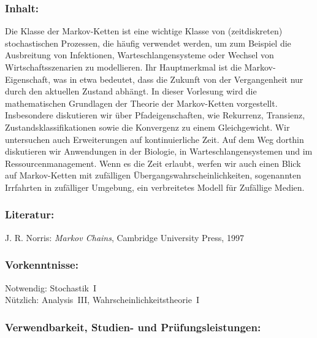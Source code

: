 \documentclass[a4paper,10pt]{article}
\begin{document}
\subsubsection*{\large
    Inhalt:
}
Die Klasse der Markov-Ketten ist eine wichtige Klasse von (zeitdiskreten) stochastischen Prozessen, die häufig verwendet werden, um zum Beispiel die Ausbreitung von Infektionen, Warteschlangensysteme oder Wechsel von Wirtschaftsszenarien zu modellieren. Ihr Hauptmerkmal ist die Markov-Eigenschaft, was in etwa bedeutet, dass die Zukunft von der Vergangenheit nur durch den aktuellen Zustand abhängt. In dieser Vorlesung wird die mathematischen Grundlagen der Theorie der Markov-Ketten vorgestellt. Insbesondere diskutieren wir über Pfadeigenschaften, wie Rekurrenz, Transienz, Zustandsklassifikationen sowie die Konvergenz zu einem Gleichgewicht. Wir untersuchen auch Erweiterungen auf kontinuierliche Zeit. Auf dem Weg dorthin diskutieren wir Anwendungen in der Biologie, in Warteschlangensystemen und  im Ressourcenmanagement. Wenn es die Zeit erlaubt, werfen wir auch einen Blick auf Markov-Ketten mit zufälligen Übergangswahrscheinlichkeiten, sogenannten Irrfahrten in zufälliger Umgebung, ein verbreitetes Modell für Zufällige Medien. 
\subsubsection*{\large
    Literatur:
}
J. R. Norris: \emph{Markov Chains}, Cambridge University Press, 1997
\subsubsection*{\large
    Vorkenntnisse:
}
Notwendig: Stochastik~I \\
Nützlich: Analysis~III,  Wahrscheinlichkeitstheorie~I
\cleardoublepage
\subsubsection*{\large
    Verwendbarkeit, Studien- und Prüfungsleistungen:
}
\end{document}
